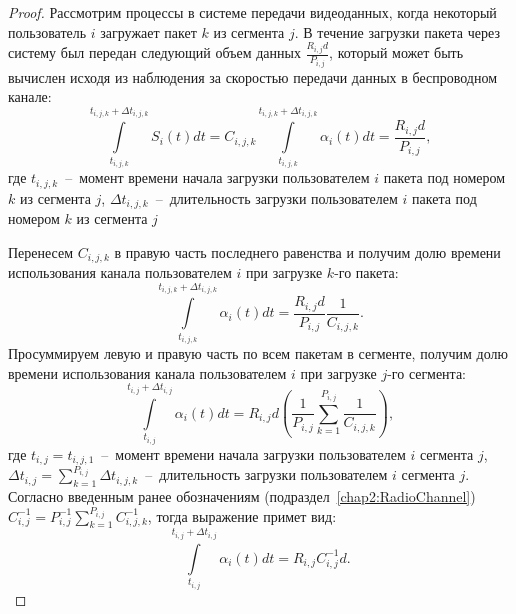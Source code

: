 \begin{proof}
Рассмотрим процессы в системе передачи видеоданных, когда некоторый пользователь $i$ загружает пакет $k$ из сегмента $j$. В течение загрузки пакета через систему был передан следующий объем данных $\frac{R_{i,j} d }{P_{i,j}}$, который может быть вычислен исходя из наблюдения за скоростью передачи данных в беспроводном канале:
\begin{equation}
	\nonumber
	\int\limits_{t_{i,j,k}}^{t_{i,j,k} + \Delta t_{i,j,k}} S_i(t) dt = C_{i,j,k} \int\limits_{t_{i,j,k}}^{t_{i,j,k} + \Delta t_{i,j,k}}\alpha_i(t) dt = \frac{R_{i,j} d }{P_{i,j}},
\end{equation}
где $t_{i,j,k}$~--~момент времени начала загрузки пользователем $i$ пакета под номером $k$ из сегмента $j$, $\Delta t_{i,j,k}$~--~длительность загрузки пользователем $i$ пакета под номером $k$ из сегмента $j$

Перенесем $C_{i,j,k}$ в правую часть последнего равенства и получим долю времени использования канала пользователем $i$ при загрузке $k$-го пакета:
\begin{equation}
	\nonumber
	\int\limits_{t_{i,j,k}}^{t_{i,j,k} + \Delta t_{i,j,k}}\alpha_i(t) dt = \frac{R_{i,j} d }{P_{i,j}}\frac{1}{C_{i,j,k}}.
\end{equation}
Просуммируем левую и правую часть по всем пакетам в сегменте, получим долю времени использования канала пользователем $i$ при загрузке $j$-го сегмента:
\begin{equation}
	\nonumber
	\int\limits_{t_{i,j}}^{t_{i,j} + \Delta t_{i,j}}\alpha_i(t) dt = R_{i,j} d\left( \frac{1}{P_{i,j}}\sum\limits_{k=1}^{P_{i,j}} \frac{1}{C_{i,j,k}}\right),
\end{equation}
где $t_{i,j} = t_{i,j,1}$~--~момент времени начала загрузки пользователем $i$ сегмента $j$, $\Delta t_{i,j} = \sum_{k = 1}^{P_{i,j}} \Delta t_{i,j,k}$~--~длительность загрузки пользователем $i$ сегмента $j$. Согласно введенным ранее обозначениям (подраздел~\ref{chap2:RadioChannel}) $C_{i,j}^{-1} = P_{i,j}^{-1}\sum_{k=1}^{P_{i,j}} C_{i,j,k}^{-1}$, тогда выражение примет вид:
\begin{equation}
	\nonumber
	\int\limits_{t_{i,j}}^{t_{i,j} + \Delta t_{i,j}}\alpha_i(t) dt = R_{i,j}C_{i,j}^{-1} d.
\end{equation}



\end{proof}
